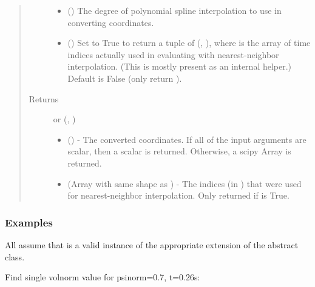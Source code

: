 \documentclass[letterpaper,10pt,english]{sphinxmanual}
\begin{document}
\begin{fulllineitems}
\begin{fulllineitems}
\begin{quote}
\begin{description}
\begin{itemize}
\item {} 
 () \textendash{} The degree of polynomial spline interpolation to
use in converting coordinates.

\item {} 
 () \textendash{} Set to True to return a tuple of (,
), where  is the array of time indices
actually used in evaluating  with nearest-neighbor
interpolation. (This is mostly present as an internal helper.)
Default is False (only return ).

\end{itemize}

\item[{Returns}] \leavevmode

 or (, )
\begin{itemize}
\item {} 
 () - The converted coordinates. If
all of the input arguments are scalar, then a scalar is returned.
Otherwise, a scipy Array is returned.

\item {} 
 (Array with same shape as ) - The indices
(in ) that were used for
nearest-neighbor interpolation. Only returned if  is
True.

\end{itemize}


\end{description}\end{quote}
\subsubsection*{Examples}

All assume that  is a valid instance of the appropriate
extension of the {\hyperref[\detokenize{eqtools:eqtools.core.Equilibrium}]{}} abstract class.

Find single volnorm value for psinorm=0.7, t=0.26s:


\end{fulllineitems}
\end{fulllineitems}
\end{document}
